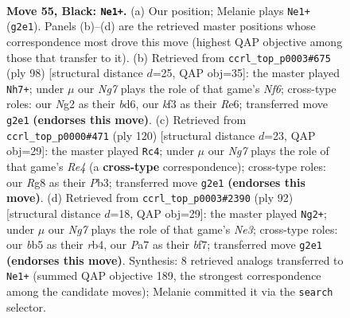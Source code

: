 \documentclass[11pt]{article}
\begin{document}
\clearpage

\begin{figure}[p]\centering
\begin{subfigure}{0.46\textwidth}\centering
\resizebox{\linewidth}{!}{%
\newchessgame
\chessboard[
  setfen={1k4r1/p7/Pp5R/1B3p2/5P2/5K2/6n1/8 b - - 2 55},
  showmover=false,
  pgfstyle=straightmove, color=movearrow, markmove={g2-e1}
]}
\caption{}
\end{subfigure}\hfill
\begin{subfigure}{0.46\textwidth}\centering
\resizebox{\linewidth}{!}{%
\newchessgame
\chessboard[
  setfen={3r4/8/3bRN2/5pk1/P1p5/5KP1/P7/8 w - - 4 50},
  showmover=false,
  pgfstyle=straightmove, color=movearrow, markmove={f6-h7}
]}
\caption{}
\end{subfigure}
\\[4pt]
\begin{subfigure}{0.46\textwidth}\centering
\resizebox{\linewidth}{!}{%
\newchessgame
\chessboard[
  setfen={8/8/8/5k1p/4Rp1P/1P3P2/4K3/1r6 w - - 20 61},
  showmover=false,
  pgfstyle=straightmove, color=movearrow, markmove={e4-c4}
]}
\caption{}
\end{subfigure}\hfill
\begin{subfigure}{0.46\textwidth}\centering
\resizebox{\linewidth}{!}{%
\newchessgame
\chessboard[
  setfen={8/5b2/3p4/3p4/1r1P1k2/3RN3/2P2K2/8 w - - 0 47},
  showmover=false,
  pgfstyle=straightmove, color=movearrow, markmove={e3-g2}
]}
\caption{}
\end{subfigure}
\caption{\textbf{Move 55, Black: \texttt{Ne1+}.} (a) Our position; Melanie plays \texttt{Ne1+} (\texttt{g2e1}). Panels (b)--(d) are the retrieved master positions whose correspondence most drove this move (highest QAP objective among those that transfer to it). (b) Retrieved from \texttt{ccrl\_top\_p0003\#675} (ply 98) [structural distance $d$=25, QAP obj=35]: the master played \texttt{Nh7+}; under $\mu$ our \emph{Ng7} plays the role of that game's \emph{Nf6}; cross-type roles: our \emph{N}g2 as their \emph{b}d6, our \emph{k}f3 as their \emph{R}e6; transferred move \texttt{g2e1} \textbf{(endorses this move)}. (c) Retrieved from \texttt{ccrl\_top\_p0000\#471} (ply 120) [structural distance $d$=23, QAP obj=29]: the master played \texttt{Rc4}; under $\mu$ our \emph{Ng7} plays the role of that game's \emph{Re4} (a \textbf{cross-type} correspondence); cross-type roles: our \emph{R}g8 as their \emph{P}b3; transferred move \texttt{g2e1} \textbf{(endorses this move)}. (d) Retrieved from \texttt{ccrl\_top\_p0003\#2390} (ply 92) [structural distance $d$=18, QAP obj=29]: the master played \texttt{Ng2+}; under $\mu$ our \emph{Ng7} plays the role of that game's \emph{Ne3}; cross-type roles: our \emph{b}b5 as their \emph{r}b4, our \emph{P}a7 as their \emph{b}f7; transferred move \texttt{g2e1} \textbf{(endorses this move)}. Synthesis: 8 retrieved analogs transferred to \texttt{Ne1+} (summed QAP objective 189, the strongest correspondence among the candidate moves); Melanie committed it via the \texttt{search} selector.}
\label{fig:thought-m109}
\end{figure}
\end{document}
